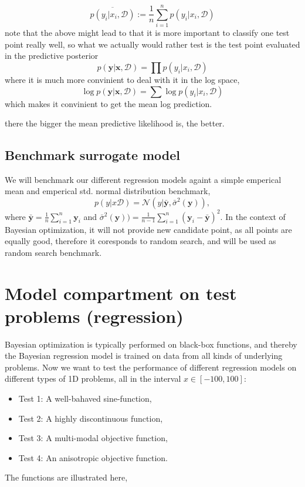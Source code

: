  $$\overline{p(y_i|x_i,\mathcal{D})} := \frac{1}{n}\sum_{i=1}^n p(y_i|x_i,\mathcal{D})$$
 note that the above might lead to that it is more important to classify one test point
 really well, so what we actually would rather test is the test point evaluated in the predictive
 posterior $$p(\textbf{y}|\textbf{x}, \mathcal{D}) = \prod p(y_i|x_i, \mathcal{D})$$
 where it is much more convinient to deal with it in the log space, 
  $$\log p(\textbf{y}|\textbf{x}, \mathcal{D}) = \sum \log p(y_i|x_i, \mathcal{D})$$
 which makes it convinient to get the mean log prediction. 
 
 there the bigger the mean predictive likelihood is, the better. 
 
\subsection{Benchmark surrogate model}
We will benchmark our different regression models againt a simple emperical mean and
emperical std. normal distribution benchmark, 
$$p(y|x\mathcal{D}) = \mathcal{N}(y| \bar{\textbf{y}} , \bar{\sigma}^2 (\textbf{y})),$$
where $\bar{\textbf{y}} = \frac{1}{n}\sum_{i=1}^n \textbf{y}_i $ and $\bar{\sigma}^2 (\textbf{y}))
= \frac{1}{n-1}\sum_{i=1}^n (\textbf{y}_i-\bar{\textbf{y}})^2 .$ In the context of Bayesian
optimization, it will not provide new candidate point, as all points are equally good, therefore
it coresponds to random search, and will be used as random search benchmark. 
 
\section{Model compartment on test problems (regression)}
Bayesian optimization is typically performed on black-box functions, and thereby the Bayesian
regression model is trained on data from all kinds of underlying problems. Now we want to test the
performance of different regression models on different types of 1D problems, all in the interval $x
\in [-100,100]$:

\begin{itemize}
  \item Test 1: A well-bahaved sine-function,
  \item Test 2: A highly discontinuous function,
  \item Test 3: A multi-modal objective function,
  \item Test 4: An anisotropic objective function.
\end{itemize}
The functions are illustrated here,


